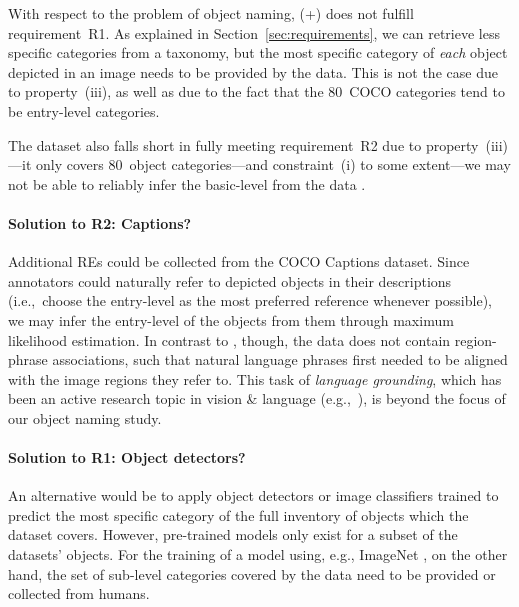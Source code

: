 {%

With respect to the problem of object naming, (+) does not fulfill requirement~R1. 
As explained in Section~\ref{sec:requirements}, we can retrieve less specific categories from a taxonomy, but the most specific category of \textit{each} object depicted in an image needs to be provided by the data. 
This is not the case due to property~(iii), as well as due to the fact that the $80$~COCO categories tend to be entry-level categories. 
%

The dataset also falls short in fully meeting requirement~R2 due to property~(iii)---it only covers 80~object categories---and constraint~(i) to some extent---we may not be able to reliably infer the basic-level from the data . 

\paragraph{Solution to R2: Captions?}
Additional REs could be collected from the COCO Captions dataset. %
Since annotators could naturally refer to depicted objects in their descriptions (i.e.,~choose the entry-level as the most preferred reference whenever possible), we may infer the entry-level of the objects from them through maximum likelihood estimation. 
%
In contrast to \flickr, though, the data does not contain region-phrase associations,  %
such that natural language phrases first needed to be aligned with the image regions they refer to. 
This task of \textit{language grounding}, which has been an active research topic in vision \& language (e.g.,~\cite{kong2014what,karpathy2015deep,rohrbach2016grounding}), is beyond the focus of our object naming study. 

\paragraph{Solution to R1: Object detectors?}
An alternative would be to apply object detectors or image classifiers trained to predict the most specific category of the full inventory of objects which the dataset covers. 
However, pre-trained models only exist for a subset of the datasets' objects. 
For the training of a model using, e.g., ImageNet \cite{imagenet_cvpr09}, on the other hand, the  set of sub-level categories covered by the data need to be provided or collected from humans. 

}
